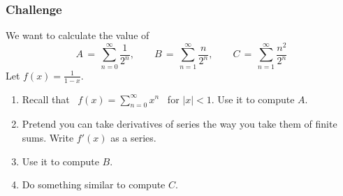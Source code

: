 \documentclass[14pt]{beamer}
\newcommand{\setsize}[1]{\fontsize{#1}{#1}\selectfont} %
\newcommand{\smallerfont}{\setsize{13}} %
\newcommand{\vvv}{\vspace{.2cm}}
\begin{document}
	\begin{frame}[t]
		\smallerfont
		\frametitle{Challenge}

		We want to calculate the value of
		\[
			A \, = \, \sum_{n=0}^{\infty}\frac{1}{2^{n}}, \quad \quad B \, = \, \sum_{n=1}
			^{\infty}\frac{n}{2^{n}}, \quad \quad C \, = \, \sum_{n=1}^{\infty}\frac{n^{2}}{2^{n}}
		\]
		Let ${\displaystyle f(x)= \frac{1}{1-x}}$.

		\hrulefill

		\begin{enumerate}
			\item Recall that \, ${\displaystyle f(x) = \sum_{n=0}^{\infty} x^n}$ \, for
				${\displaystyle |x|<1}$. Use it to compute $A$.

			\item Pretend you can take derivatives of series the way you take them of finite
				sums. Write ${\displaystyle f'(x)}$ as a series. \vvv

			\item Use it to compute $B$. \vvv

			\item Do something similar to compute $C$.
		\end{enumerate}
	\end{frame}
\end{document}
